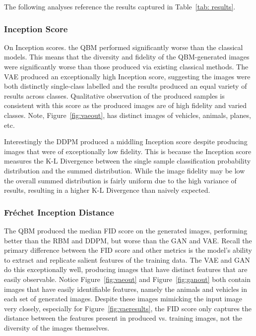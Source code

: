 \documentclass[%
 reprint,
 amsmath,amssymb,
 aps,
]{revtex4-2}
\begin{document}
The following analyses reference the results captured in Table~\ref{tab: results}.

\subsubsection{Inception Score}
On Inception scores. the QBM performed significantly worse than the classical models. This means that the diversity and fidelity of the QBM-generated images were significantly worse than those produced via existing classical methods. The VAE produced an exceptionally high Inception score, suggesting the images were both distinctly single-class labelled and the results produced an equal variety of results across classes. Qualitative observation of the produced samples is consistent with this score as the produced images are of high fidelity and varied classes. Note, Figure~\ref{fig:vaeout}, has distinct images of vehicles, animals, planes, etc.


Interestingly the DDPM produced a middling Inception score despite producing images that were of exceptionally low fidelity. This is because the Inception score measures the K-L Divergence between the single sample classification probability distribution and the summed distribution. While the image fidelity may be low the overall summed distribution is fairly uniform due to the high variance of results, resulting in a higher K-L Divergence than naively expected.

\subsubsection{Fréchet Inception Distance}
The QBM produced the median FID score on the generated images, performing better than the RBM and DDPM, but worse than the GAN and VAE. Recall the primary difference between the FID score and other metrics is the model's ability to extract and replicate salient features of the training data. The VAE and GAN do this exceptionally well, producing images that have distinct features that are easily observable. Notice Figure~\ref{fig:vaeout} and Figure~\ref{fig:ganout} both contain images that have easily identifiable features, namely the animals and vehicles in each set of generated images. Despite these images mimicking the input image very closely, especially for Figure~\ref{fig:vaeresults}, the FID score only captures the distance between the features present in produced vs. training images, not the diversity of the images themselves.
\end{document}
